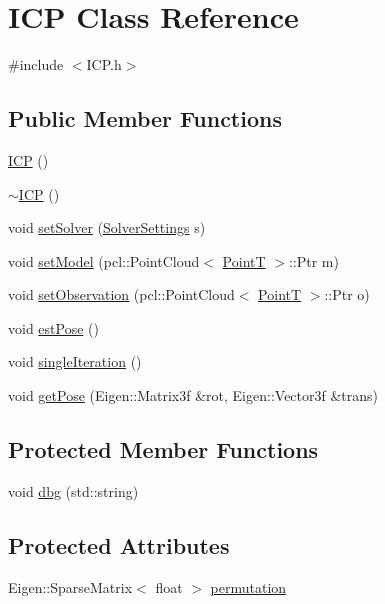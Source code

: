 \hypertarget{classICP}{\section{\-I\-C\-P \-Class \-Reference}
\label{classICP}
}


{\ttfamily \#include $<$\-I\-C\-P.\-h$>$}

\subsection*{\-Public \-Member \-Functions}
\begin{DoxyCompactItemize}
\item 
\hyperlink{classICP_a6a6f021c394b70387f0163239a74f94b}{\-I\-C\-P} ()
\item 
\hyperlink{classICP_a744eea059d43f0794b50d15ed056746a}{$\sim$\-I\-C\-P} ()
\item 
void \hyperlink{classICP_a49b0a9fafd601c49f7cdd55edaa0f7a7}{set\-Solver} (\hyperlink{structSolverSettings}{\-Solver\-Settings} s)
\item 
void \hyperlink{classICP_a7e02bf0f96bacf61fb7462c852be3c08}{set\-Model} (pcl\-::\-Point\-Cloud$<$ \hyperlink{common_8h_abd10555a534258e2739a38c928ef5db1}{\-Point\-T} $>$\-::\-Ptr m)
\item 
void \hyperlink{classICP_a65d3a5293b19ec80f5f569abccd8b395}{set\-Observation} (pcl\-::\-Point\-Cloud$<$ \hyperlink{common_8h_abd10555a534258e2739a38c928ef5db1}{\-Point\-T} $>$\-::\-Ptr o)
\item 
void \hyperlink{classICP_a8168f085dc9bf3916ea9b170f4a8b6f3}{est\-Pose} ()
\item 
void \hyperlink{classICP_a1dfd1ad0ea3c83ade91595cc3ecd24f2}{single\-Iteration} ()
\item 
void \hyperlink{classICP_af9624105149162bf1c80b2e70cbcf135}{get\-Pose} (\-Eigen\-::\-Matrix3f \&rot, \-Eigen\-::\-Vector3f \&trans)
\end{DoxyCompactItemize}
\subsection*{\-Protected \-Member \-Functions}
\begin{DoxyCompactItemize}
\item 
void \hyperlink{classICP_a5e20a89dfd2f5f95a61122d268375b72}{dbg} (std\-::string)
\end{DoxyCompactItemize}
\subsection*{\-Protected \-Attributes}
\begin{DoxyCompactItemize}
\item 
\-Eigen\-::\-Sparse\-Matrix$<$ float $>$ \hyperlink{classICP_aade0504cb0e1d5abcb2c2add2be606b1}{permutation}
\end{DoxyCompactItemize}
